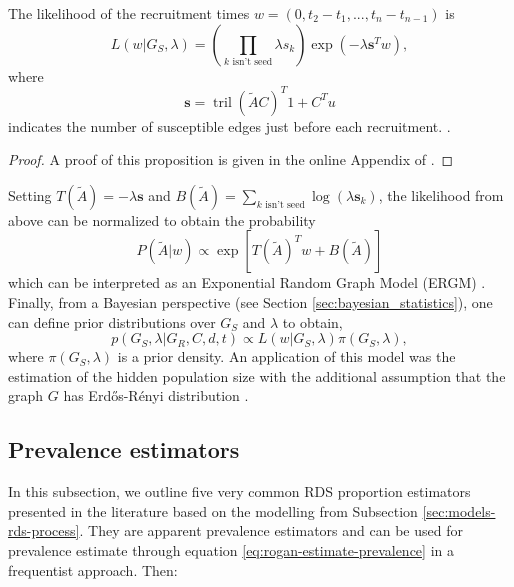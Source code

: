 \begin{proposition}
  The likelihood of the recruitment times $w = (0, t_2 - t_1, ..., t_n -
  t_{n-1})$ is 
  \begin{equation}
    \label{eq:likelihood-wainting-times}
    L(w| G_S, \lambda) = \left(\prod_{k \text{ isn't seed}} \lambda s_k\right) \exp(-\lambda \boldsymbol{s}^Tw), 
  \end{equation}
  where 
  \begin{equation*}
    \boldsymbol{s} = \operatorname{tril}(\tilde{A}C)^T 1 + C^Tu 
  \end{equation*}
  indicates the number of susceptible edges just before each recruitment.
  \cite[p. 197]{crawford2016}.
\end{proposition}

\begin{proof}
  A proof of this proposition is given in the online Appendix of
  \cite{crawford2016}. 
\end{proof}

Setting $T(\tilde{A}) = -\lambda \boldsymbol{s}$ and $B(\tilde{A}) = \sum_{k \text{ isn't seed}}
\log(\lambda \boldsymbol{s}_k)$, the likelihood from above can be normalized to obtain
the probability 
\begin{equation*}
  P(\tilde{A}|w) \propto \exp\left[T(\tilde{A})^Tw + B(\tilde{A})\right]
\end{equation*}
which can be interpreted as an Exponential Random Graph Model (ERGM) \cite[p.
198]{crawford2016}. Finally, from a Bayesian perspective (see Section
\ref{sec:bayesian_statistics}), one can define prior distributions over $G_S$
and $\lambda$ to obtain, 
\begin{equation}
  \label{eq:posterior-distribution-graph}
  p(G_S, \lambda | G_R,C,d,t) \propto L(w|G_S, \lambda) \pi(G_S, \lambda), 
\end{equation}
where $\pi(G_S, \lambda)$ is a prior density. An application of this model was
the estimation of the hidden population size with the additional assumption
that the graph $G$ has Erdős-Rényi distribution 
\cite{crawford2018hidden}. 

\subsection{Prevalence estimators}

In this subsection, we outline five very common RDS proportion estimators presented in the
literature based on the modelling from Subsection
\ref{sec:models-rds-process}. They are apparent prevalence estimators and can
be used for prevalence estimate through equation
\eqref{eq:rogan-estimate-prevalence} in a frequentist approach. Then:

